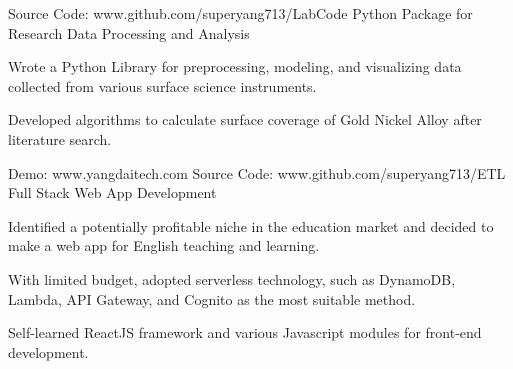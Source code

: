 


\begin{cventries}


\cventry
{Source Code: www.github.com/superyang713/LabCode}
{Python Package for Research Data Processing and Analysis}
{}
{}
{
\begin{cvitems}
\item {Wrote a Python Library for preprocessing, modeling, and visualizing data
    collected from various surface science instruments.}
\item {Developed algorithms to calculate surface coverage of Gold Nickel Alloy
    after literature search.}
\end{cvitems}
}


\cventry
{Demo: www.yangdaitech.com   Source Code: www.github.com/superyang713/ETL}
{Full Stack Web App Development}
{}
{}
{
\begin{cvitems}
\item {Identified a potentially profitable niche in the education market and
    decided to make a web app for English teaching and learning.}
\item {With limited budget, adopted serverless technology, such as DynamoDB,
    Lambda, API Gateway, and Cognito as the most suitable method.}
\item {Self-learned ReactJS framework and various Javascript modules for
    front-end development.}
\end{cvitems}
}


\end{cventries}


